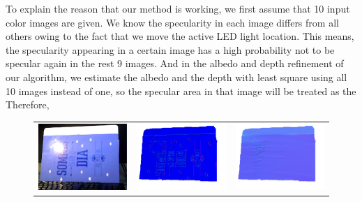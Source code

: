To explain the reason that our method is working, we first assume that 10 input color images are given.
We know the specularity in each image differs from all others owing to the fact that we move the active LED light location.
This means, the specularity appearing in a certain image has a high probability not to be specular again in the rest 9 images.
And in the albedo and depth refinement of our algorithm, we estimate the albedo and the depth with least square using all 10 images instead of one, so the specular area in that image will be treated as the 
Therefore, 


\begin{figure}[!ht]
\centering
\setlength{\tabcolsep}{0.1em} %
 {\renewcommand{\arraystretch}{1.6}%
\begin{tabular}{c|c c}
   \includegraphics[height = 0.24\linewidth]{figures/result/robust_folder_rgb.pdf} 
   &
   \includegraphics[height = 0.24\linewidth]{figures/result/rgbd_folder_normal.pdf} &
   \includegraphics[height = 0.24\linewidth]{figures/result/robust_folder_normal.pdf} \\


\end{tabular}}
\end{figure}
